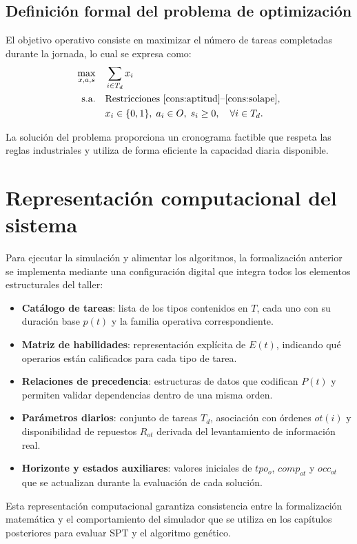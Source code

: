 \subsection{Definición formal del problema de optimización}

El objetivo operativo consiste en maximizar el número de tareas completadas durante la jornada, lo cual se expresa como:
\[
\begin{aligned}
\max_{x,a,s} \quad & \sum_{i \in T_d} x_i \\
\text{s.a.} \quad & \text{Restricciones \eqref{cons:aptitud}--\eqref{cons:solape}}, \\
& x_i \in \{0,1\}, \; a_i \in O, \; s_i \geq 0, \quad \forall i \in T_d.
\end{aligned}
\]

La solución del problema proporciona un cronograma factible que respeta las reglas industriales y utiliza de forma
 eficiente la capacidad diaria disponible.

\section{Representación computacional del sistema}

Para ejecutar la simulación y alimentar los algoritmos, la formalización anterior se implementa mediante una
configuración digital que integra todos los elementos estructurales del taller:
\begin{itemize}
    \item \textbf{Catálogo de tareas}: lista de los tipos contenidos en \(T\), cada uno con su duración base \(p(t)\) y la
    familia operativa correspondiente.
    \item \textbf{Matriz de habilidades}: representación explícita de \(E(t)\), indicando qué operarios están calificados para
    cada tipo de tarea.
    \item \textbf{Relaciones de precedencia}: estructuras de datos que codifican \(P(t)\) y permiten validar dependencias dentro
    de una misma orden.
    \item \textbf{Parámetros diarios}: conjunto de tareas \(T_d\), asociación con órdenes \(ot(i)\) y disponibilidad de repuestos
    \(R_{ot}\) derivada del levantamiento de información real.
    \item \textbf{Horizonte y estados auxiliares}: valores iniciales de \(tpo_o\), \(comp_{ot}\) y \(occ_{ot}\) que se actualizan
    durante la evaluación de cada solución.
\end{itemize}

Esta representación computacional garantiza consistencia entre la formalización matemática y el comportamiento del
simulador que se utiliza en los capítulos posteriores para evaluar SPT y el algoritmo genético.
